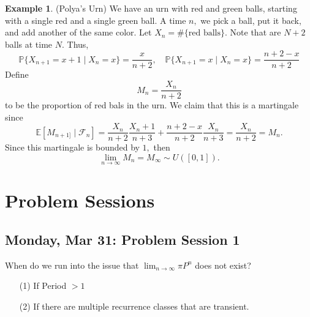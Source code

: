 \documentclass[10pt, oneside]{article}
\newcommand{\bbP}{\mathbb{P}}
\newcommand{\bbE}{\mathbb{E}}
\theoremstyle{definition}
\newtheorem{exmp}{Example}[section]
\begin{document}
\begin{exmp}
    (Polya's Urn) We have an urn with red and green balls, starting with a single red and a single green ball. A time $n,$ we pick a ball, put it back, and add another of the same color. Let $X_n = \#\{\text{red balls}\}.$ Note that are $N + 2$ balls at time $N.$ Thus,
    \[\bbP\{X_{n + 1} = x+1 \mid X_n = x\} = \frac{x}{n+2}, \quad \bbP\{X_{n+ 1} = x \mid X_n = x\} = \frac{n + 2 - x}{n+2}\] Define 
    \[M_n = \frac{X_n}{n+2}\] to be the proportion of red bals in the urn. We claim that this is a martingale since 
    \[\bbE[M_{n+1]} \mid \mathcal{F}_n] = \frac{X_n}{n+2}\frac{X_n + 1}{n+3} + \frac{n+2 - x}{n+2}\frac{X_n}{n+3} = \frac{X_n}{n+2} = M_n.\] Since this martingale is bounded by $1,$ then 
    \[\lim_{n\to \infty} M_n = M_\infty \sim U([0,1]).\]
\end{exmp}


\newpage
\section{Problem Sessions}
\subsection{Monday, Mar 31: Problem Session 1}
When do we run into the issue that $\lim_{n\to \infty}\pi P^n$ does not exist? 
\begin{enumerate}
    \item[(1)] If Period $> 1$
    \item[(2)] If there are multiple recurrence classes that are transient.
\end{enumerate}
\end{document}
